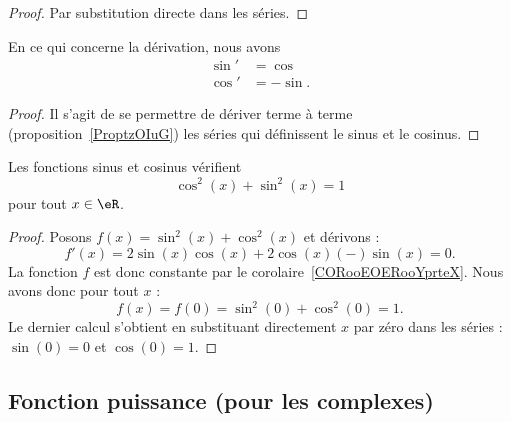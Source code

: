 \begin{proof}
	Par substitution directe dans les séries.
\end{proof}

\begin{lemma}       \label{LEMooBBCAooHLWmno}
	En ce qui concerne la dérivation, nous avons
	\begin{subequations}
		\begin{align}
			\sin' & =\cos   \\
			\cos' & =-\sin.
		\end{align}
	\end{subequations}
\end{lemma}

\begin{proof}
	Il s'agit de se permettre de dériver terme à terme (proposition~\ref{ProptzOIuG}) les séries qui définissent le sinus et le cosinus.
\end{proof}

\begin{lemma}       \label{LEMooAEFPooGSgOkF}
	Les fonctions sinus et cosinus vérifient
	\begin{equation}        \label{EQooNYCZooApyyRd}
		\cos^2(x)+\sin^2(x)=1
	\end{equation}
	pour tout \( x\in \eR\).
\end{lemma}

\begin{proof}
	Posons \( f(x)=\sin^2(x)+\cos^2(x)\) et dérivons :
	\begin{equation}
		f'(x)=2\sin(x)\cos(x)+2\cos(x)(-)\sin(x)=0.
	\end{equation}
	La fonction \( f\) est donc constante par le corolaire~\ref{CORooEOERooYprteX}. Nous avons donc pour tout \( x\) :
	\begin{equation}
		f(x)=f(0)=\sin^2(0)+\cos^2(0)=1.
	\end{equation}
	Le dernier calcul s'obtient en substituant directement \( x\) par zéro dans les séries : \( \sin(0)=0\) et \( \cos(0)=1\).
\end{proof}

\subsection{Fonction puissance (pour les complexes)}

